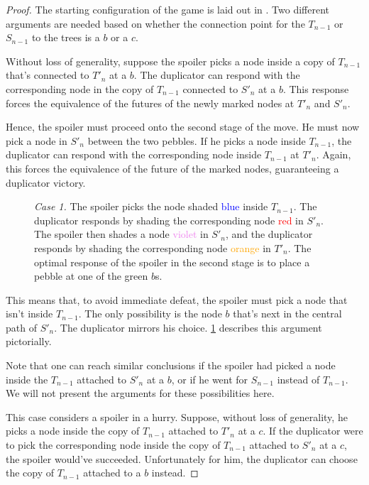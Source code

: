 \documentclass[a4paper,UKenglish,cleveref, autoref, thm-restate, numberwithinsect]{lipics-v2021}
\begin{document}
\begin{proof}
    The starting configuration of the game is laid out in . Two different arguments are needed based on whether the connection point for the $T_{n - 1}$ or $S_{n - 1}$ to the trees is a $b$ or a $c$.

    Without loss of generality, suppose the spoiler picks a node inside a copy of $T_{n - 1}$ that's connected to $T'_n$ at a $b$. The duplicator can respond with the corresponding node in the copy of $T_{n - 1}$ connected to $S'_n$ at a $b$. This response forces the equivalence of the futures of the newly marked nodes at $T'_n$ and $S'_n$.

    Hence, the spoiler must proceed onto the second stage of the move. He must now pick a node in $S'_n$ between the two pebbles. If he picks a node inside $T_{n - 1}$, the duplicator can respond with the corresponding node inside $T_{n-1}$ at $T'_n$. Again, this forces the equivalence of the future of the marked nodes, guaranteeing a duplicator victory.
    \begin{figure}[h]
        \centering
        \caption{\emph{Case 1.} The spoiler picks the node shaded \textcolor{blue}{blue} inside $T_{n - 1}$. The duplicator responds by shading the corresponding node \textcolor{red}{red} in $S'_n$. The spoiler then shades a node \textcolor{violet}{violet} in $S'_n$, and the duplicator responds by shading the corresponding node \textcolor{orange}{orange} in $T'_n$. The optimal response of the spoiler in the second stage is to place a pebble at one of the \textcolor{OliveGreen}{green} $b$s.}
        \label{proofstep1fig}
    \end{figure}

    This means that, to avoid immediate defeat, the spoiler must pick a node that isn't inside $T_{n-1}$. The only possibility is the node $b$ that's next in the central path of $S'_n$. The duplicator mirrors his choice. \cref{proofstep1fig} describes this argument pictorially.

    Note that one can reach similar conclusions if the spoiler had picked a node inside the $T_{n - 1}$ attached to $S'_n$ at a $b$, or if he went for $S_{n - 1}$ instead of $T_{n - 1}$. We will not present the arguments for these possibilities here.

    This case considers a spoiler in a hurry. Suppose, without loss of generality, he picks a node inside the copy of $T_{n - 1}$ attached to $T'_n$ at a $c$. If the duplicator were to pick the corresponding node inside the copy of $T_{n - 1}$ attached to $S'_n$ at a $c$, the spoiler would've succeeded. Unfortunately for him, the duplicator can choose the copy of $T_{n - 1}$ attached to a $b$ instead.


\end{proof}
\end{document}

